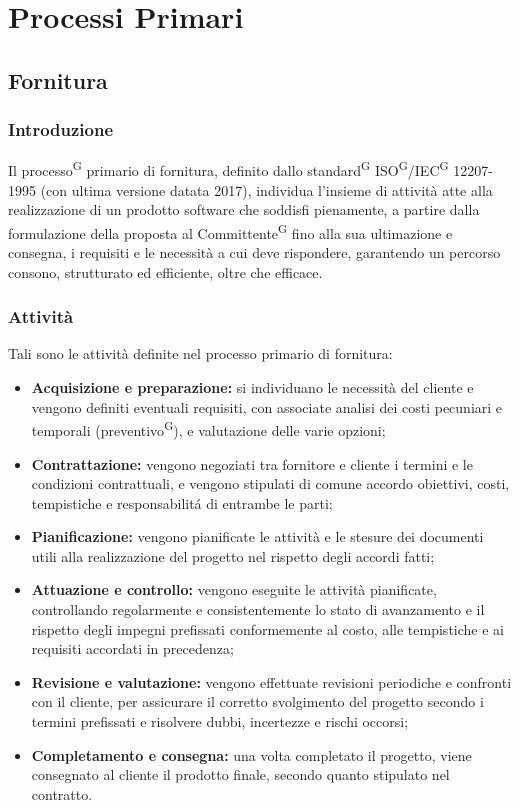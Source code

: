 \documentclass[8pt]{article}
\newcommand{\glossterm}[1]{#1\textsuperscript{G}} %
\begin{document}
\section{Processi Primari} \label{sec:processi_primari}

\subsection{Fornitura}

\subsubsection{Introduzione} 
Il \glossterm{processo} primario di fornitura, definito dallo \glossterm{standard}
\glossterm{ISO}/\glossterm{IEC} 12207-1995 (con ultima versione datata 2017), individua l'insieme di
attività atte alla realizzazione di un prodotto software che soddisfi pienamente, a partire dalla
formulazione della proposta al \glossterm{Committente} fino alla sua ultimazione e consegna, i requisiti e le necessità a cui deve rispondere, garantendo un percorso consono, strutturato ed efficiente, oltre che efficace.

\subsubsection{Attività}
Tali sono le attività definite nel processo primario di fornitura:

\begin{itemize}
    \item \textbf{Acquisizione e preparazione:} si individuano le necessità del cliente e vengono definiti eventuali requisiti, con associate analisi dei costi pecuniari e temporali (\glossterm{preventivo}), e valutazione delle varie opzioni;
    \item \textbf{Contrattazione:} vengono negoziati tra fornitore e cliente i termini e le condizioni contrattuali, e vengono stipulati di comune accordo obiettivi, costi, tempistiche e responsabilitá di entrambe le parti;
    \item \textbf{Pianificazione:} vengono pianificate le attività e le stesure dei documenti utili alla realizzazione del progetto nel rispetto degli accordi fatti;
    \item \textbf{Attuazione e controllo:} vengono eseguite le attività pianificate, controllando regolarmente e consistentemente lo stato di avanzamento e il rispetto degli impegni prefissati conformemente al costo, alle tempistiche e ai requisiti accordati in precedenza;
    \item \textbf{Revisione e valutazione:} vengono effettuate revisioni periodiche e confronti con il cliente, per assicurare il corretto svolgimento del progetto secondo i termini prefissati e risolvere dubbi, incertezze e rischi occorsi;
    \item \textbf{Completamento e consegna:} una volta completato il progetto, viene consegnato al cliente il prodotto finale, secondo quanto stipulato nel contratto.
\end{itemize}
\end{document}
